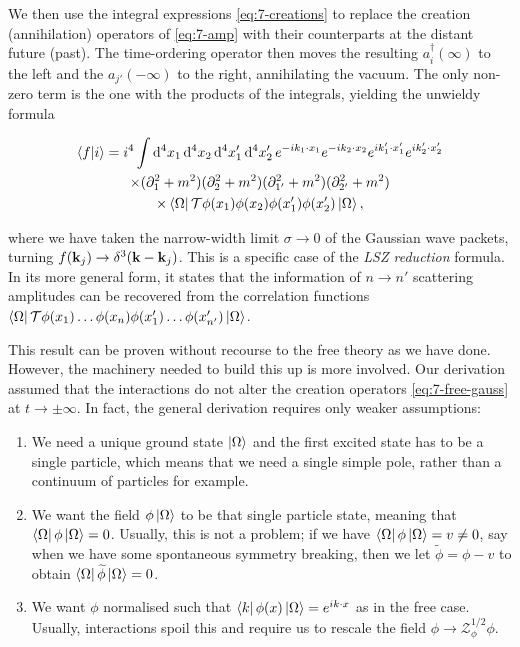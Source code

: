 We then use the integral expressions \eqref{eq:7-creations} to replace the creation (annihilation) operators of \eqref{eq:7-amp} with their counterparts at the distant future (past).
The time-ordering operator then moves the resulting $a_i^{\dagger}(\infty)$ to the left and the $a_{j'}(-\infty)$ to the right, annihilating the vacuum. The only non-zero term is the one with the products of the integrals, yielding the unwieldy formula
\begin{simplebox}
  \begin{multline}
    \label{eq:lsz}
    \bra{f}\ket{i} = i^4 \int \dd[4]{x_1} \dd[4]{x_2} \dd[4]{x_1'}\dd[4]{x_2'} e^{-i k_1 \cdot x_1} e^{-i k_2 \cdot x_2} e^{i k_1' \cdot x_1'} e^{i k_2' \cdot x_2'} \\
     \times (\partial_1^2 + m^2) (\partial^2_2 + m^2) (\partial_{1'}^2 + m^2) (\partial_{2'}^2 + m^2) \\
     \times \bra{\Omega} \mathcal{T} \phi(x_1) \phi(x_2) \phi(x_1') \phi(x_2') \ket{\Omega},
  \end{multline}
\end{simplebox}
where we have taken the narrow-width limit $\sigma \to 0$ of the Gaussian wave packets, turning $f(\vb{k}_j) \to \delta^3 (\vb{k} - \vb{k}_j)$.
This is a specific case of the \emph{LSZ reduction} formula.
In its more general form, it states that the information of $n \to n'$ scattering amplitudes can be recovered from the correlation functions $\bra{\Omega} \mathcal{T} \phi(x_1) \dots \phi(x_n) \phi(x'_1) \dots \phi(x'_{n'}) \ket{\Omega}$.

This result can be proven without recourse to the free theory as we have done. However, the machinery needed to build this up is more involved.
Our derivation assumed that the interactions do not alter the creation operators \eqref{eq:7-free-gauss} at $t \to \pm \infty$.
In fact, the general derivation requires only weaker assumptions:
\begin{enumerate}[1)]
  \item We need a unique ground state $\ket{\Omega}$ and the first excited state has to be a single particle, which means that we need a single simple pole, rather than a continuum of particles for example.
  \item We want the field $\phi \ket{\Omega}$ to be that single particle state, meaning that $ \bra{\Omega} \phi \ket{\Omega} = 0$.
    Usually, this is not a problem; if we have $\bra{\Omega} \phi \ket{\Omega} = v \neq 0$, say when we have some spontaneous symmetry breaking, then we let $\widetilde{\phi} = \phi - v$ to obtain $\bra{\Omega} \widetilde{\phi} \ket{ \Omega} = 0$.
  \item We want $\phi$ normalised such that $\bra{k} \phi(x) \ket{\Omega} = e^{i k \cdot x}$ as in the free case.
  Usually, interactions spoil this and require us to rescale the field $\phi \to \mathcal{Z}_\phi^{1 / 2} \phi$.
\end{enumerate}

